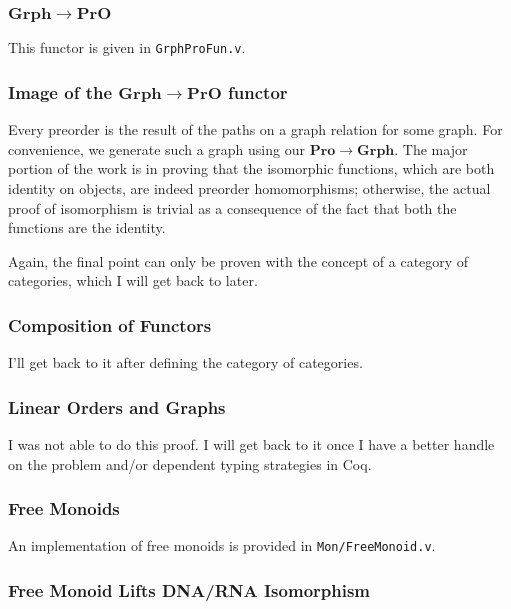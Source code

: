 \documentclass[12pt,twocolumn,oneside]{book}
\begin{document}
\subsubsection{$\mathbf{Grph} \to \mathbf{PrO}$}

This functor is given in \texttt{GrphProFun.v}.


\subsubsection{Image of the $\mathbf{Grph} \to \mathbf{PrO}$ functor}

Every preorder is the result of the paths on a graph relation for some graph. For convenience,
we generate such a graph using our $\mathbf{Pro} \to \mathbf{Grph}$. The major
portion of the work is in proving that the isomorphic functions, which are both
identity on objects, are indeed preorder homomorphisms; otherwise, the actual proof
of isomorphism is trivial as a consequence of the fact that both the functions are
the identity.

Again, the final point can only be proven with the concept of a category of categories,
which I will get back to later.

\subsubsection{Composition of Functors}

I'll get back to it after defining the category of categories.

\subsubsection{Linear Orders and Graphs}

I was not able to do this proof. I will get back to it once I have a better handle
on the problem and/or dependent typing strategies in Coq.


\subsubsection{Free Monoids}

An implementation of free monoids is provided in \texttt{Mon/FreeMonoid.v}.

\subsubsection{Free Monoid Lifts DNA/RNA Isomorphism}
\end{document}
